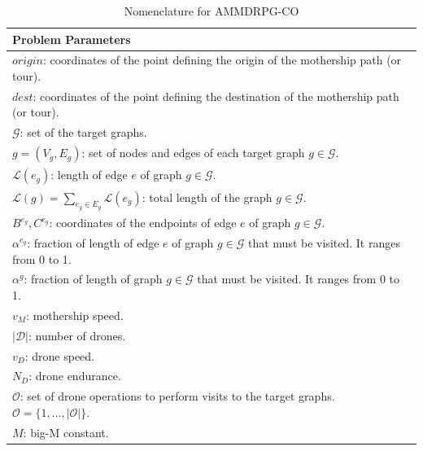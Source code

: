 \documentclass[10pt,a4paper]{elsarticle}
\newcommand{\EN}[1]{{\color{black}#1}}
\begin{document}
\begin{table}[!h]
\scriptsize
\centering
\begin{tabular}{ | l | }
	\hline
	\textbf{Problem Parameters}\\
	\hline
	$origin$: coordinates of the point defining the origin of the mothership path (or tour).\\
	$dest$: coordinates of the point defining the destination of the mothership path (or tour).\\
	$\mathcal{G}$: set of the target graphs.\\
	$g = (V_g, E_g)$: set of nodes and edges of each target graph $g \in \mathcal{G}$.\\
	$\mathcal{L}(e_g)$: length of edge $e$ of graph $g \in \mathcal{G}$.\\
	$\mathcal{L}(g)=\sum_{e_g\in E_g} \mathcal L(e_g)$: total length of the graph $g\in\mathcal G$.\\
	$B^{e_g}, C^{e_g}$: coordinates of the endpoints of edge $e$ of graph $g \in \mathcal{G}$.\\
	$\alpha^{e_g}$: fraction of length of edge $e$ of graph $g \in \mathcal{G}$ that must be visited. It ranges \EN{from 0 to 1}. \\
	$\alpha^{g}$: fraction of length of graph $g \in \mathcal{G}$ that must be visited. It ranges \EN{from 0 to 1.}\\
	$v_M$: mothership speed.\\
	$|\mathcal D|$: number of drones.\\
	$v_D$: drone speed.\\
	$N_D$: drone endurance. \\
	$\mathcal{O}$: set of drone operations to perform visits to the target graphs. $\mathcal{O} =\{1,\ldots,|\mathcal{O}|\}$.\\
	$M$: big-M constant.\\
	\hline
\end{tabular}
\caption{Nomenclature for AMMDRPG-CO}
\label{table:t1}
\end{table}
\end{document}
